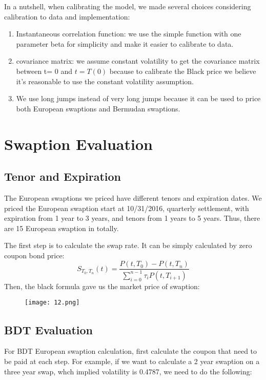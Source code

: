\documentclass[paper = letterpaper, fontsize=12pt]{article}
\begin{document}
In a nutshell, when calibrating the model, we made several choices considering calibration to data and implementation: 
\begin{enumerate}
\item Instantaneous correlation function: we use the simple function with one parameter beta for simplicity and make it easier to calibrate to data.
\item covariance matrix: we assume constant volatility to get the covariance matrix between t= 0 and $t = T(0)$ because to calibrate the Black price we believe it’s reasonable to use the constant volatility assumption.
\item We use long jumps instead of very long jumps because it can be used to price both European swaptions and Bermudan swaptions.

\end{enumerate}





\section{Swaption Evaluation}
\subsection{Tenor and Expiration}
The European swaptions we priced have different tenors and expiration dates. We priced the European swaption start at 10/31/2016, quarterly settlement, with expiration from 1 year to 3 years, and tenors from 1 years to 5 years. Thus, there are 15 European swaption in totally.

The first step is to calculate the swap rate. It can be simply calculated by zero coupon bond price:
\[
	S_{T_0, T_n}(t) = \frac{P(t, T_0) - P(t, T_n)}{\sum_{i=0}^{n-1}\tau_iP(t, T_{i+1})}
\] 
Then, the black formula gave us the market price of swaption:

\begin{figure}[H]
    \centering
    \texttt{[image: 12.png]}
\end{figure}

\subsection{BDT Evaluation}
For BDT European swaption calculation, first calculate the coupon that need to be paid at each step. For example, if we want to calculate a 2 year swaption on a three year swap, whch implied volatility is 0.4787, we need to do the following:
\end{document}
